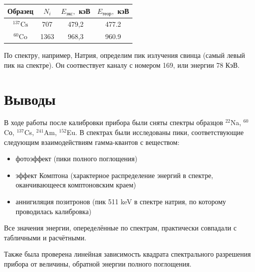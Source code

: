 \documentclass[a4paper, 12pt]{article}
\begin{document}
\begin{table}[H]
	\centering
	\begin{tabular}{|c|c|c|c|}
	\hline
	Образец                      & $ N_i $ & $ E_\text{экс}, $ кэВ & $ E_\text{теор}, $ кэВ \\ \hline
	 $ \mathrm{^{137}Cs} $  & 707     & 479,2                & 477.2                  \\ \hline
	$ \mathrm{^{60}Co} $ & 1363    & 968,3                & 960.9                  \\ \hline
	\end{tabular}
	\end{table}
По спектру, например, Натрия, определим пик излучения свинца (самый левый пик на спектре). Он соотвествует каналу с номером 169, или энергии 78 КэВ.
\section{Выводы}
В ходе работы после калибровки прибора были сняты спектры образцов $^{22}$Na,  $^{60}$Cо,  $^{137}$Cs, $^{241}$Am, $^{152}$Eu. В спектрах были исследованы пики, соответствующие следующим взаимодействиям гамма-квантов с веществом:
\begin{itemize}
    \item фотоэффект (пики полного поглощения)
    \item эффект Комптона (характерное распределение энергий в спектре, оканчивающееся комптоновским краем)
    \item аннигиляция позитронов (пик 511 keV в спектре натрия, по которому проводилась калибровка)
\end{itemize}

Все значения энергии, опеределённые по спектрам, практически совпадали с табличными и расчётными. \par

Также была проверена линейная зависимость квадрата спектрального разрешения прибора от величины, обратной энергии полного поглощения.
\end{document}
